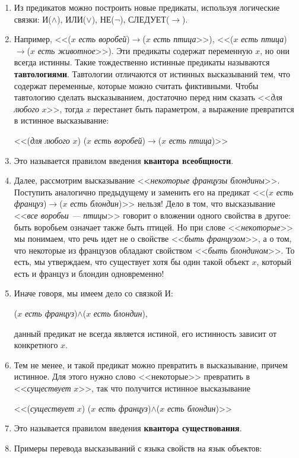 \begin{enumerate}
\item Из предикатов можно построить новые предикаты, используя логические связки: И($\land$), ИЛИ($\lor$), НЕ($\neg$), СЛЕДУЕТ($\to$).
\item Например, <<($x$ \textit{есть воробей})$\to$($x$ \textit{есть птица}>>), <<($x$ \textit{есть птица})$\to$($x$ \textit{есть животное}>>). Эти предикаты содержат переменную $x$, но они всегда истинны. Такие тождественно истинные предикаты называются \textbf{тавтологиями}. Тавтологии отличаются от истинных высказываний тем, что содержат переменные, которые можно считать фиктивными. Чтобы тавтологию сделать высказыванием, достаточно перед ним сказать <<\textit{для любого} $x$>>, тогда $x$ перестанет быть параметром, а выражение превратится в истинное высказывание:

\begin{center}
<<(\textit{для любого} $x$) ($x$ \textit{есть воробей})$\to$($x$ \textit{есть птица})>>
\end{center}
\item Это называется правилом введения \textbf{квантора всеобщности}.
\item Далее, рассмотрим высказывание <<\textit{некоторые французы блондины}>>. Поступить аналогично предыдущему и заменить его на  предикат <<($x$ \textit{есть француз})$\to$($x$ \textit{есть блондин})>> нельзя! Дело в том, что высказывание <<\textit{все воробьи --- птицы}>> говорит о вложении одного свойства в другое: быть воробьем означает также быть птицей. Но при слове <<\textit{некоторые}>> мы понимаем, что речь идет не о свойстве <<\textit{быть французом}>>, а о том, что некоторые из французов обладают свойством <<\textit{быть блондином}>>. То есть, мы утверждаем, что существует хотя бы один такой объект $x$, который есть и француз и блондин одновременно!
\item Иначе говоря, мы имеем дело со связкой И:
\begin{center}
($x$ \textit{есть француз})$\land$($x$ \textit{есть блондин}),
\end{center}
данный предикат не всегда является истиной, его истинность зависит от конкретного $x$.
\item Тем не менее, и такой предикат можно превратить в высказывание, причем истинное. Для этого нужно слово <<некоторые>> превратить в <<\textit{существует} $x$>>, так что получится истинное высказывание
\begin{center}
<<(\textit{существует} $x$) ($x$ \textit{есть француз})$\land$($x$ \textit{есть блондин})>>
\end{center}
\item Это называется правилом введения \textbf{квантора существования}.
\item Примеры перевода высказываний с языка свойств на язык объектов:\hfill\;


\end{enumerate}

